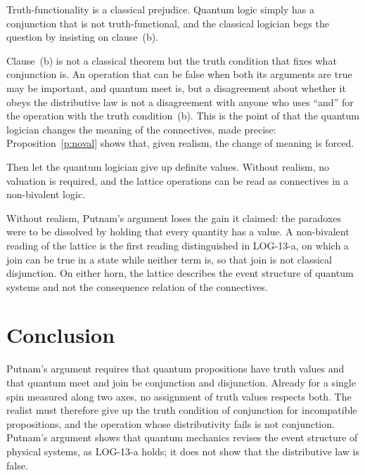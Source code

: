 \documentclass{situationist-preprint}
\begin{document}
\begin{objection}
Truth-functionality is a classical prejudice. Quantum logic simply has a conjunction that is not truth-functional, and the classical logician begs the question by insisting on clause~(b).
\end{objection}

\begin{reply}
Clause~(b) is not a classical theorem but the truth condition that fixes what conjunction is. An operation that can be false when both its arguments are true may be important, and quantum meet is, but a disagreement about whether it obeys the distributive law is not a disagreement with anyone who uses \enquote{and} for the operation with the truth condition~(b). This is the point of \citet{Dummett1976} that the quantum logician changes the meaning of the connectives, made precise: Proposition~\ref{p:noval} shows that, given realism, the change of meaning is forced.
\end{reply}

\begin{objection}
Then let the quantum logician give up definite values. Without realism, no valuation is required, and the lattice operations can be read as connectives in a non-bivalent logic.
\end{objection}

\begin{reply}
Without realism, Putnam's argument loses the gain it claimed: the paradoxes were to be dissolved by holding that every quantity has a value. A non-bivalent reading of the lattice is the first reading distinguished in LOG-13-a, on which a join can be true in a state while neither term is, so that join is not classical disjunction. On either horn, the lattice describes the event structure of quantum systems and not the consequence relation of the connectives.
\end{reply}

\section{Conclusion}

Putnam's argument requires that quantum propositions have truth values and that quantum meet and join be conjunction and disjunction. Already for a single spin measured along two axes, no assignment of truth values respects both. The realist must therefore give up the truth condition of conjunction for incompatible propositions, and the operation whose distributivity fails is not conjunction. Putnam's argument shows that quantum mechanics revises the event structure of physical systems, as LOG-13-a holds; it does not show that the distributive law is false.
\end{document}
